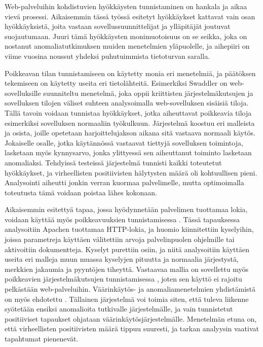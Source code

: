 Web-palveluihin kohdistuvien hyökkäysten tunnistaminen on hankala ja aikaa vievä prosessi. Aikaisemmin tässä työssä esitetyt hyökkäykset kattavat vain osan hyökkäyksistä, joita vastaan sovellussuunnittelijat ja
ylläpitäjät joutuvat suojautumaan. Juuri tämä hyökkäysten monimuotoisuus on se seikka, joka on nostanut anomaliatutkimuksen muiden menetelmien yläpuolelle, ja aihepiiri on viime vuosina noussut yhdeksi 
puhutuimmista tietoturvan saralla. 

Poikkeavan tilan tunnistamiseen on käytetty monia eri menetelmiä, ja päätöksen tekemiseen on käytetty useita eri tietolähteitä. Esimerkiksi Swaddler \cite{Swaddler} on 
web-sovelluksille suunniteltu menetelmä, joka oppii kriittisten järjestelmäkutsujen ja sovelluksen tilojen väliset suhteen analysoimalla web-sovelluksen sisäisiä tiloja. Tällä tavoin voidaan tunnistaa hyökkäykset,
jotka aiheuttavat poikkeavia tiloja esimerkiksi sovelluksen normaaliin työkulkuun. Järjestelmä koostuu eri malleista ja osista, joille opetetaan harjoittelujakson aikana sitä vastaava normaali käytös. Jokaiselle
osalle, jotka käytännössä vastaavat tiettyjä sovelluksen toimintoja, lasketaan myös kynnysarvo, jonka ylittyessä sen aiheuttanut toiminto lasketaan anomaliaksi. Tehdyissä testeissä järjestelmä tunnisti 
kaikki toteutetut hyökkäykset, ja virheellisten positiivisten hälytysten määrä oli kohtuullisen pieni. Analysointi aiheutti jonkin verran kuormaa palvelimelle, mutta optimoimalla toteutusta tämä voidaan poistaa
lähes kokonaan. 

Aikaisemmin esitettyä tapaa, jossa hyödynnetään palvelimen tuottamaa lokia, voidaan käyttää myös poikkeavuuksien tunnistamisessa \cite{Multi}. Tässä tapauksessa analysoitiin Apachen tuottamaa HTTP-lokia, ja huomio
kiinnitettiin kyselyihin, joissa parametreja käyttäen välitettiin arvoja palvelinpuolen ohjelmille tai aktivoitiin dokumentteja. Kyselyt purettiin osiin, ja niitä analysoitiin käyttäen useita eri malleja 
muun muassa kyselyjen pituutta ja normaalia järjestystä, merkkien jakaumia ja pyyntöjen tiheyttä. Vastaavaa mallia on sovellettu myös poikkeavien järjestelmäkutsujen tunnistamisessa \cite{SystemCall}, joten sen 
käyttö ei rajoitu pelkästään web-palveluihin. Väärinkäytös- ja anomaliamenetelmien yhdistämistä on myös ehdotettu \cite{Combination}. Tällainen järjestelmä voi toimia siten, että tuleva liikenne syötetään ensiksi 
anomalioita tutkivalle järjestelmälle, ja vain tunnistetut positiiviset tapaukset ohjataan väärinkäytösjärjestelmälle. Menetelmän etuna on, että virheellisten positiivisten määrä tippuu suuresti, ja tarkan 
analyysin vaativat tapahtumat pienenevät.
